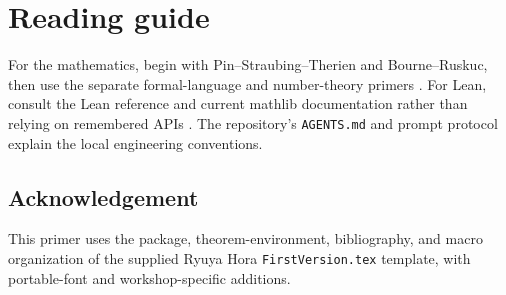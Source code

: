 \documentclass{amsart}
\begin{document}
\section{Reading guide}

For the mathematics, begin with Pin--Straubing--Therien and Bourne--Ruskuc, then use the separate formal-language and number-theory primers \cite{pinStraubingTherien1992,bourneRuskuc2016,bourne2017counting}.  For Lean, consult the Lean reference and current mathlib documentation rather than relying on remembered APIs \cite{demoura2021lean4,mathlib2020lean,avigad2024mathematics}.  The repository's \nolinkurl{AGENTS.md} and prompt protocol explain the local engineering conventions.

\subsection*{Acknowledgement}

This primer uses the package, theorem-environment, bibliography, and macro organization of the supplied Ryuya Hora \nolinkurl{FirstVersion.tex} template, with portable-font and workshop-specific additions.

\printbibliography
\end{document}
